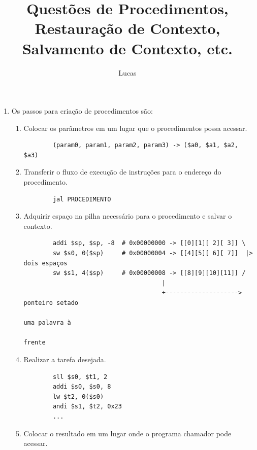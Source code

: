 \documentclass{article}
\author{Lucas}
\title{Questões de Procedimentos, Restauração de Contexto, Salvamento de 
Contexto, etc.}
\begin{document}
\maketitle

\begin{enumerate}

\item Os passos para criação de procedimentos são:

  \begin{enumerate}
    \item Colocar os parâmetros em um lugar que o procedimentos possa acessar.

      \begin{verbatim}
        (param0, param1, param2, param3) -> ($a0, $a1, $a2, $a3)
      \end{verbatim}

    \item Transferir o fluxo de execução de instruções para o endereço do
    procedimento.

      \begin{verbatim}
        jal PROCEDIMENTO
      \end{verbatim}

    \item Adquirir espaço na pilha necessário para o procedimento e salvar o
    contexto.

      \begin{verbatim}
        addi $sp, $sp, -8  # 0x00000000 -> [[0][1][ 2][ 3]] \
        sw $s0, 0($sp)     # 0x00000004 -> [[4][5][ 6][ 7]]  |> dois espaços
        sw $s1, 4($sp)     # 0x00000008 -> [[8][9][10][11]] /
                                      |
                                      +--------------------> ponteiro setado
                                                             uma palavra à
                                                             frente
      \end{verbatim}

    \item Realizar a tarefa desejada.

      \begin{verbatim}
        sll $s0, $t1, 2
        addi $s0, $s0, 8
        lw $t2, 0($s0)
        andi $s1, $t2, 0x23
        ...
      \end{verbatim}

    \item Colocar o resultado em um lugar onde o programa chamador pode acessar.


\end{enumerate}
\end{enumerate}
\end{document}
